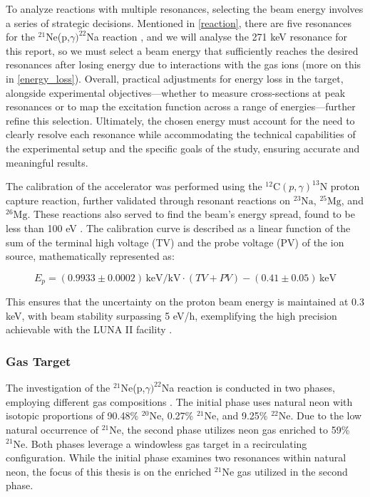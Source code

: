 \documentclass[a4paper,12pt]{article}
\def\reac{$^{21}$Ne(p,$\gamma)^{22}$Na reaction }
\begin{document}
To analyze reactions with multiple resonances, selecting the beam energy involves a series of strategic decisions. Mentioned in \ref{reaction}, there are five resonances for the \reac, and we will analyse the 271 keV resonance for this report, so we must select a beam energy that sufficiently reaches the desired resonances after losing energy due to interactions with the gas ions (more on this in \ref{energy_loss}). Overall, practical adjustments for energy loss in the target, alongside experimental objectives—whether to measure cross-sections at peak resonances or to map the excitation function across a range of energies—further refine this selection. Ultimately, the chosen energy must account for the need to clearly resolve each resonance while accommodating the technical capabilities of the experimental setup and the specific goals of the study, ensuring accurate and meaningful results.

The calibration of the accelerator was performed using the $^{12}\text{C}(p,\gamma)^{13}\text{N}$ proton capture reaction, further validated through resonant reactions on $^{23}\text{Na}$, $^{25}\text{Mg}$, and $^{26}\text{Mg}$. These reactions also served to find the beam's energy spread, found to be less than 100 eV \cite{FORMICOLA2003609}. The calibration curve is described as a linear function of the sum of the terminal high voltage (TV) and the probe voltage (PV) of the ion source, mathematically represented as:

\begin{equation}
E_p = (0.9933 \pm 0.0002) \, \text{keV/kV} \cdot (TV + PV) - (0.41 \pm 0.05) \, \text{keV}
\end{equation}

This ensures that the uncertainty on the proton beam energy is maintained at 0.3 keV, with beam stability surpassing 5 eV/h, exemplifying the high precision achievable with the LUNA II facility \cite{FORMICOLA2003609}.


\subsubsection{Gas Target}

The investigation of the \reac is conducted in two phases, employing different gas compositions . The initial phase uses natural neon with isotopic proportions of 90.48\% \(^{20}\text{Ne}\), 0.27\% \(^{21}\text{Ne}\), and 9.25\% \(^{22}\text{Ne}\). Due to the low natural occurrence of \(^{21}\text{Ne}\), the second phase utilizes neon gas enriched to 59\% \(^{21}\text{Ne}\). Both phases leverage a windowless gas target in a recirculating configuration. While the initial phase examines two resonances within natural neon, the focus of this thesis is on the enriched \(^{21}\text{Ne}\) gas utilized in the second phase.
\end{document}

